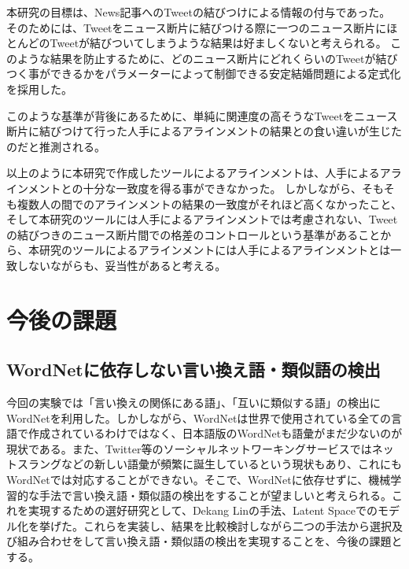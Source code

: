 \documentclass[12pt]{jarticle}
\begin{document}
本研究の目標は、News記事へのTweetの結びつけによる情報の付与であった。
そのためには、Tweetをニュース断片に結びつける際に一つのニュース断片にほとんどのTweetが結びついてしまうような結果は好ましくないと考えられる。
このような結果を防止するために、どのニュース断片にどれくらいのTweetが結びつく事ができるかをパラメーターによって制御できる安定結婚問題による定式化を採用した。

このような基準が背後にあるために、単純に関連度の高そうなTweetをニュース断片に結びつけて行った人手によるアラインメントの結果との食い違いが生じたのだと推測される。


以上のように本研究で作成したツールによるアラインメントは、人手によるアラインメントとの十分な一致度を得る事ができなかった。
しかしながら、そもそも複数人の間でのアラインメントの結果の一致度がそれほど高くなかったこと、そして本研究のツールには人手によるアラインメントでは考慮されない、Tweetの結びつきのニュース断片間での格差のコントロールという基準があることから、本研究のツールによるアラインメントには人手によるアラインメントとは一致しないながらも、妥当性があると考える。

\section{今後の課題}
\subsection{WordNetに依存しない言い換え語・類似語の検出}
今回の実験では「言い換えの関係にある語」、「互いに類似する語」の検出にWordNetを利用した。しかしながら、WordNetは世界で使用されている全ての言語で作成されているわけではなく、日本語版のWordNetも語彙がまだ少ないのが現状である。また、Twitter等のソーシャルネットワーキングサービスではネットスラングなどの新しい語彙が頻繁に誕生しているという現状もあり、これにもWordNetでは対応することができない。そこで、WordNetに依存せずに、機械学習的な手法で言い換え語・類似語の検出をすることが望ましいと考えられる。これを実現するための選好研究として、Dekang Linの手法\cite{DekangLin}、Latent Spaceでのモデル化\cite{LatentSpace}を挙げた。これらを実装し、結果を比較検討しながら二つの手法から選択及び組み合わせをして言い換え語・類似語の検出を実現することを、今後の課題とする。
\end{document}
